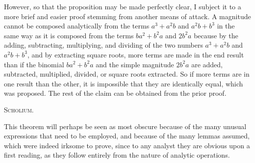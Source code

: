 \documentclass[11pt,letterpaper]{book}
\begin{document}
However, so that the proposition may be made perfectly clear, I subject it to
a more brief and easier proof stemming from another means of attack. A
magnitude cannot be composed analytically from the terms $a^{3}+a^{2}b$ and
$a^{2}b+b^{3}$ in the same way as it is composed from the
terms $ba^{2}+b^{2}a$ and $2b^{2}a$ because by the adding, subtracting,
multiplying, and dividing of the two numbers $a^{3}+a^{2}b$ and $a^{2}b+b^{3}$,
and by extracting square roots, more terms are made in the end result than if
the binomial $ba^2+b^2a$ and the simple magnitude $2b^2a$ are added, subtracted,
multiplied, divided, or square roots extracted.  So if more terms are in one
result than the other, it is impossible that they are identically equal, which
was proposed. The rest of the claim can be obtained from the prior proof.

\begin{samepage}
\begin{center}
\large\textsc{Scholium.}
\end{center}

This theorem will perhaps be seen as most obscure because of the many unusual
expressions that need to be employed, and because of the many lemmas assumed,
which were indeed irksome to prove, since to any analyst they are obvious
upon a first reading, as they follow entirely from the nature of analytic
operations.


\end{samepage}
\end{document}

